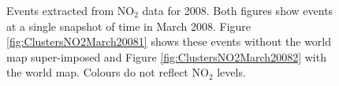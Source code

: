 \documentclass[11pt]{article}
\begin{document}
	\begin{figure}[H]
		\centering
		\caption{\footnotesize Events extracted from $\text{NO}_2$ data for 2008. Both figures show events at a single snapshot of time in March 2008. Figure \ref{fig:ClustersNO2March20081} shows these events without the world map super-imposed and Figure \ref{fig:ClustersNO2March20082}  with the world map. Colours do not reflect $\text{NO}_2$ levels.  }
		\label{fig:ClustersNO2March2008}
	\end{figure}
	
\end{document}
